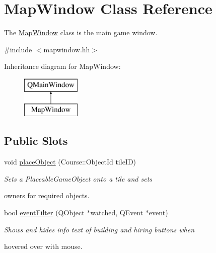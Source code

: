 \hypertarget{classMapWindow}{\section{Map\-Window Class Reference}
\label{classMapWindow}
}


The \hyperlink{classMapWindow}{Map\-Window} class is the main game window.  




{\ttfamily \#include $<$mapwindow.\-hh$>$}

Inheritance diagram for Map\-Window\-:\begin{figure}[H]
\begin{center}
\leavevmode
\includegraphics[height=2.000000cm]{classMapWindow}
\end{center}
\end{figure}
\subsection*{Public Slots}
\begin{DoxyCompactItemize}
\item 
void \hyperlink{classMapWindow_a39948451de86944d283ac9fc972cf271}{place\-Object} (Course\-::\-Object\-Id tile\-I\-D)
\begin{DoxyCompactList}\small\item\em Sets a Placeable\-Game\-Object onto a tile and sets \par
owners for required objects. \end{DoxyCompactList}\item 
bool \hyperlink{classMapWindow_a014ed30c996e95f034a71e3ab66947ef}{event\-Filter} (Q\-Object $\ast$watched, Q\-Event $\ast$event)
\begin{DoxyCompactList}\small\item\em Shows and hides info text of building and hiring buttons when \par
 hovered over with mouse. \end{DoxyCompactList}\end{DoxyCompactItemize}
